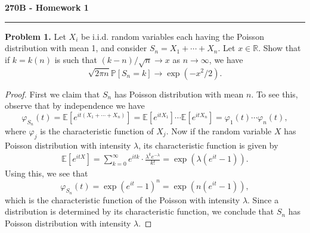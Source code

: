 \documentclass[11pt,letterpaper]{report}
\newcommand{\reals}{\mathbb{R}}
\newcommand{\E}{\mathbb{E}}
\newcommand{\Prob}{\mathbb{P}}
\begin{document}
\begin{center}
{\bf \Large 270B - Homework 1}
\vspace{0.2cm}
\hrule
\end{center}

\noindent\textbf{Problem 1. }Let $X_i$ be i.i.d. random variables each having the Poisson distribution with mean 1, and consider $S_n = X_1 + \cdots + X_n$. Let $x\in \reals$. Show that if $k = k(n)$ is such that $(k-n)/\sqrt{n}\to x$ as $n\to \infty$, we have
\[
\sqrt{2\pi n}\Prob[S_n = k] \to \exp(-x^2/2).
\]
\begin{proof}
	First we claim that $S_n$ has Poisson distribution with mean $n$. To see this, observe that by independence we have
	\begin{equation}\label{chfsum}
		\varphi_{S_n}(t) = \E\left[e^{it(X_1 + \cdots + X_n)}\right] = \E\left[e^{itX_1}\right]\cdots \E\left[e^{itX_n}\right] = \varphi_1(t)\cdots \varphi_n(t),
	\end{equation}
	where $\varphi_j$ is the characteristic function of $X_j$. Now if the random variable $X$ has Poisson distribution with intensity $\lambda$, its characteristic function is given by
	\begin{align*}
		\E\left[e^{itX}\right] = \sum_{k=0}^\infty e^{itk}\cdot \frac{\lambda^ke^{-\lambda}}{k!} = \exp(\lambda(e^{it}-1)).
	\end{align*}
	Using this, we see that
	\[
	\varphi_{S_n}(t) = \exp(e^{it}-1)^n = \exp(n(e^{it} - 1)),
	\]
	which is the characteristic function of the Poisson with intensity $\lambda$. Since a distribution is determined by its characteristic function, we conclude that $S_n$ has Poisson distribution with intensity $\lambda$.
\end{proof}
\end{document}
